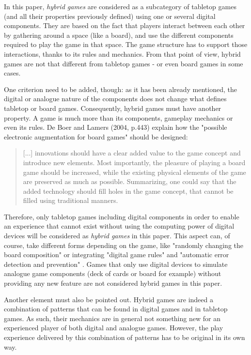 In this paper, \textit{hybrid games} are considered as a subcategory of tabletop games (and all their properties previously defined) using one or several digital components. They are based on the fact that players interact between each other by gathering around a space (like a board), and use the different components required to play the game in that space. The game structure has to support those interactions, thanks to its rules and mechanics. From that point of view, hybrid games are not that different from tabletop games - or even board games in some cases.


One criterion need to be added, though: as it has been already mentioned, the digital or analogue nature of the components does not change what defines tabletop or board games. Consequently, hybrid games must have another property. A game is much more than its components, gameplay mechanics or even its rules. De Boer and Lamers (2004, p.443) \cite{chap:aug} explain how the "possible electronic augmentation for board games" should be designed:

\begin{quotation}
[...] innovations should have a clear added value to the game concept and introduce new elements. Most importantly, the pleasure of playing a board game should be increased, while the existing physical elements of the game are preserved as much as possible. Summarizing, one could say that the added technology should fill holes in the game concept, that cannot be filled using traditional manners.
\end{quotation}

Therefore, only tabletop games including digital components in order to enable an experience that cannot exist without using the computing power of digital devices will be considered as \textit{hybrid games} in this paper. This aspect can, of course, take different forms depending on the game, like "randomly changing the board composition" or integrating "digital game rules" and "automatic error detection and prevention" \cite{chap:aug}. Games that only use digital devices to simulate analogue game components (deck of cards or board for example) without providing any new feature are not considered hybrid games in this paper.

Another element must also be pointed out. Hybrid games are indeed a combination of patterns that can be found in digital games and in tabletop games. As such, their mechanics are in general not something new for an experienced player of both digital and analogue games. However, the play experience delivered by this combination of patterns has to be original in its own way.

